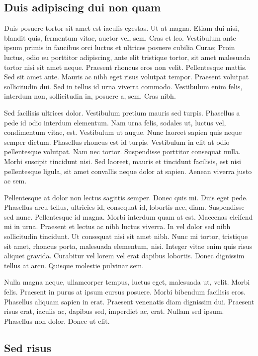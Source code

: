 \documentclass[../hdr.tex]{subfiles}
\begin{document}
\subsection{Duis adipiscing dui non quam}

Duis posuere tortor sit amet est iaculis egestas. Ut at magna. Etiam dui nisi,
blandit quis, fermentum vitae, auctor vel, sem. Cras et leo. Vestibulum ante
ipsum primis in faucibus orci luctus et ultrices posuere cubilia Curae; Proin
luctus, odio eu porttitor adipiscing, ante elit tristique tortor, sit amet
malesuada tortor nisi sit amet neque. Praesent rhoncus eros non velit.
Pellentesque mattis. Sed sit amet ante. Mauris ac nibh eget risus volutpat
tempor. Praesent volutpat sollicitudin dui. Sed in tellus id urna viverra
commodo. Vestibulum enim felis, interdum non, sollicitudin in, posuere a, sem.
Cras nibh.

Sed facilisis ultrices dolor. Vestibulum pretium mauris sed turpis. Phasellus a
pede id odio interdum elementum. Nam urna felis, sodales ut, luctus vel,
condimentum vitae, est. Vestibulum ut augue. Nunc laoreet sapien quis neque
semper dictum. Phasellus rhoncus est id turpis. Vestibulum in elit at odio
pellentesque volutpat. Nam nec tortor. Suspendisse porttitor consequat nulla.
Morbi suscipit tincidunt nisi. Sed laoreet, mauris et tincidunt facilisis, est
nisi pellentesque ligula, sit amet convallis neque dolor at sapien. Aenean
viverra justo ac sem.

Pellentesque at dolor non lectus sagittis semper. Donec quis mi. Duis eget pede.
Phasellus arcu tellus, ultricies id, consequat id, lobortis nec, diam.
Suspendisse sed nunc. Pellentesque id magna. Morbi interdum quam at est.
Maecenas eleifend mi in urna. Praesent et lectus ac nibh luctus viverra. In vel
dolor sed nibh sollicitudin tincidunt. Ut consequat nisi sit amet nibh. Nunc mi
tortor, tristique sit amet, rhoncus porta, malesuada elementum, nisi. Integer
vitae enim quis risus aliquet gravida. Curabitur vel lorem vel erat dapibus
lobortis. Donec dignissim tellus at arcu. Quisque molestie pulvinar sem.

Nulla magna neque, ullamcorper tempus, luctus eget, malesuada ut, velit. Morbi
felis. Praesent in purus at ipsum cursus posuere. Morbi bibendum facilisis eros.
Phasellus aliquam sapien in erat. Praesent venenatis diam dignissim dui.
Praesent risus erat, iaculis ac, dapibus sed, imperdiet ac, erat. Nullam sed
ipsum. Phasellus non dolor. Donec ut elit.

\subsection{Sed risus}
\end{document}
